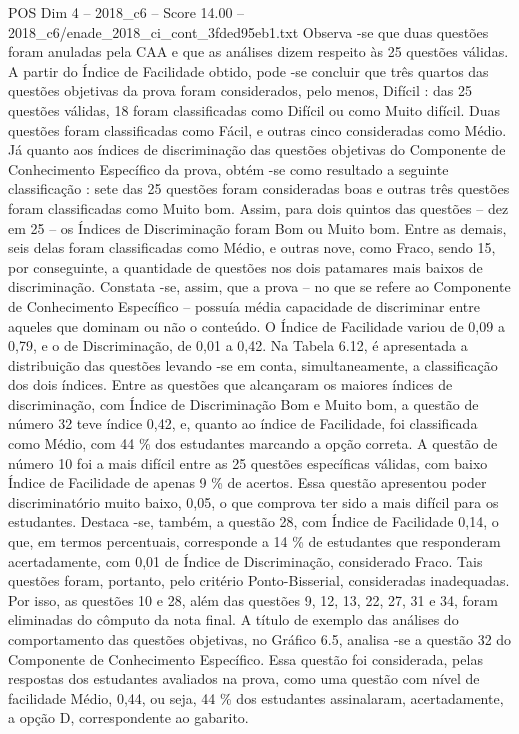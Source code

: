 \begin{textsample}{POS Dim 4 – 2018\_c6 – Score 14.00 – 2018\_c6/enade\_2018\_ci\_cont\_3fded95eb1.txt}
Observa -se que duas questões foram anuladas pela CAA e que as análises dizem respeito às 25 questões válidas.
A partir do Índice de Facilidade obtido, pode -se concluir que três quartos das questões objetivas da prova foram considerados, pelo menos, Difícil : das 25 questões válidas, 18 foram classificadas como Difícil ou como Muito difícil.
Duas questões foram classificadas como Fácil, e outras cinco consideradas como Médio.
Já quanto aos índices de discriminação das questões objetivas do Componente de Conhecimento Específico da prova, obtém -se como resultado a seguinte classificação : sete das 25 questões foram consideradas boas e outras três questões foram classificadas como Muito bom.
Assim, para dois quintos das questões – dez em 25 – os Índices de Discriminação foram Bom ou Muito bom.
Entre as demais, seis delas foram classificadas como Médio, e outras nove, como Fraco, sendo 15, por conseguinte, a quantidade de questões nos dois patamares mais baixos de discriminação.
Constata -se, assim, que a prova – no que se refere ao Componente de Conhecimento Específico – possuía média capacidade de discriminar entre aqueles que dominam ou não o conteúdo.
O Índice de Facilidade variou de 0,09 a 0,79, e o de Discriminação, de 0,01 a 0,42.
Na Tabela 6.12, é apresentada a distribuição das questões levando -se em conta, simultaneamente, a classificação dos dois índices.
Entre as questões que alcançaram os maiores índices de discriminação, com Índice de Discriminação Bom e Muito bom, a questão de número 32 teve índice 0,42, e, quanto ao índice de Facilidade, foi classificada como Médio, com 44 \% dos estudantes marcando a opção correta.
A questão de número 10 foi a mais difícil entre as 25 questões específicas válidas, com baixo Índice de Facilidade de apenas 9 \% de acertos.
Essa questão apresentou poder discriminatório muito baixo, 0,05, o que comprova ter sido a mais difícil para os estudantes.
Destaca -se, também, a questão 28, com Índice de Facilidade 0,14, o que, em termos percentuais, corresponde a 14 \% de estudantes que responderam acertadamente, com 0,01 de Índice de Discriminação, considerado Fraco.
Tais questões foram, portanto, pelo critério Ponto-Bisserial, consideradas inadequadas.
Por isso, as questões 10 e 28, além das questões 9, 12, 13, 22, 27, 31 e 34, foram eliminadas do cômputo da nota final.
A título de exemplo das análises do comportamento das questões objetivas, no Gráfico 6.5, analisa -se a questão 32 do Componente de Conhecimento Específico.
Essa questão foi considerada, pelas respostas dos estudantes avaliados na prova, como uma questão com nível de facilidade Médio, 0,44, ou seja, 44 \% dos estudantes assinalaram, acertadamente, a opção D, correspondente ao gabarito.

\end{textsample}
